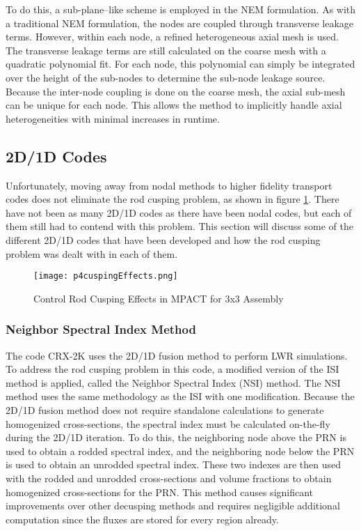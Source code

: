 To do this, a sub-plane--like scheme is employed in the NEM formulation.  As with a traditional NEM formulation, the nodes are coupled through transverse leakage terms.  However, within each node, a refined heterogeneous axial mesh is used.  The transverse leakage terms are still calculated on the coarse mesh with a quadratic polynomial fit.  For each node, this polynomial can simply be integrated over the height of the sub-nodes to determine the sub-node leakage source.  Because the inter-node coupling is done on the coarse mesh, the axial sub-mesh can be unique for each node.  This allows the method to implicitly handle axial heterogeneities with minimal increases in runtime.

\subsection{2D/1D Codes}\label{ss:2d1d-old-decusping-methods}

Unfortunately, moving away from nodal methods to higher fidelity transport codes does not eliminate the rod cusping problem, as shown in figure \ref{f:p4cuspingEffects}.  There have not been as many 2D/1D codes as there have been nodal codes, but each of them still had to contend with this problem.  This section will discuss some of the different 2D/1D codes that have been developed and how the rod cusping problem was dealt with in each of them.

\begin{figure}[h]
    \centering
    \texttt{[image: p4cuspingEffects.png]}
    \caption[Rod Cusping in MPACT]{Control Rod Cusping Effects in MPACT for 3x3 Assembly}\label{f:p4cuspingEffects}
\end{figure}

\subsubsection{Neighbor Spectral Index Method}

The code CRX-2K \cite{cho2015CRX2d1dFusionDecusping} uses the 2D/1D fusion method to perform LWR simulations.  To address the rod cusping problem in this code, a modified version of the ISI method is applied, called the Neighbor Spectral Index (NSI) method.  The NSI method uses the same methodology as the ISI with one modification.  Because the 2D/1D fusion method does not require standalone calculations to generate homogenized cross-sections, the spectral index must be calculated on-the-fly during the 2D/1D iteration.  To do this, the neighboring node above the PRN is used to obtain a rodded spectral index, and the neighboring node below the PRN is used to obtain an unrodded spectral index.  These two indexes are then used with the rodded and unrodded cross-sections and volume fractions to obtain homogenized cross-sections for the PRN.  This method causes significant improvements over other decusping methods and requires negligible additional computation since the fluxes are stored for every region already.

